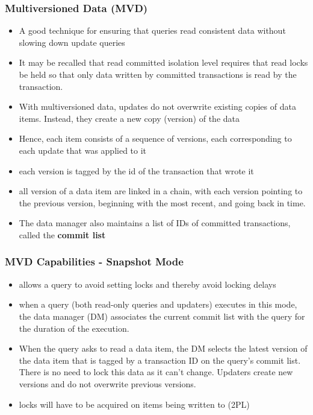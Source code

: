 \documentclass[12]{beamer}
\begin{document}
\begin{frame}
\frametitle{Multiversioned Data (MVD)}
\begin{itemize} 
\item A good technique for ensuring that queries read consistent data without slowing down update queries
\item It may be recalled that read committed isolation level requires that read locks be held so that only data written by committed transactions is read by the transaction.
\item With multiversioned data, updates do not overwrite existing copies of data items. Instead, they create a new copy (version) of the data
\item Hence, each item consists of a sequence of versions, each corresponding to each update that was applied to it
\item each version is tagged by the id of the transaction that wrote it
\item all version of a data item are linked in a chain, with each version pointing to the previous version, beginning with the most recent, and going back in time.
\item The data manager also maintains a list of IDs of committed transactions, called the \textbf{commit list}
\end{itemize}
\end{frame}

\begin{frame}
\frametitle{MVD Capabilities - Snapshot Mode}
\begin{itemize}
\item allows a query to avoid setting locks and thereby avoid locking delays
\item when a query (both read-only queries and updaters) executes in this mode, the data manager (DM) associates the current commit list with the query for the duration of the execution.
\item When the query asks to read a data item, the DM selects the latest version of the data item that is tagged by a transaction ID on the query's commit list. There is no need to lock this data as it can't change. Updaters create new versions and do not overwrite previous versions.
\item locks will have to be acquired on items being written to (2PL)
\end{itemize}
\end{frame}
\end{document}
